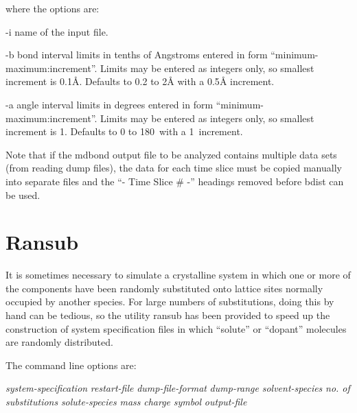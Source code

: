 \documentclass[a4paper,twoside]{report}
\begin{document}
where the options are:
\begin{Argdescription}
\item[-i] name of the input file.
\item[-b] bond interval limits in tenths of Angstroms entered in form
  ``minimum-maximum:increment''. Limits may be entered as integers
  only, so smallest increment is 0.1{\AA}. Defaults to 0.2 to 2{\AA} with
  a 0.5{\AA} increment.
\item[-a] angle interval limits in degrees entered in form
  ``minimum-maximum:increment''. Limits may be entered as integers only,
  so smallest increment is 1{\textdegree}. Defaults to 0 to
  180{\textdegree}\ with a 1{\textdegree}\ increment.
\end{Argdescription}

Note that if the mdbond output file to be analyzed contains
multiple data sets (from reading dump files), the data for each time slice
must be copied manually into separate files and the ``- Time Slice \# -''
headings removed before bdist can be used.


\section{Ransub}%
It is sometimes necessary to simulate a crystalline system in which one or
more of the components have been randomly substituted onto lattice sites
normally occupied by another species. For large numbers of substitutions,
doing this by hand can be tedious, so the utility ransub has been provided
to speed up the construction of system specification files in which
``solute'' or ``dopant'' molecules are randomly distributed.
        
The command line options are:
\begin{center}
\Lit{[-s} \textit{system-specification}\Lit{]}
\Lit{[-r} \textit{restart-file}\Lit{]}
\Lit{[-d} \textit{dump-file-format}\Lit{]}
\Lit{[-t} \textit{dump-range}\Lit{]} 
\Lit{[-m} \textit{solvent-species}\Lit{]} 
\Lit{[-n} \textit{no. of substitutions}\Lit{]} 
\Lit{[-u} \textit{solute-species}\Lit{]} 
\Lit{[-w} \textit{mass}\Lit{]} 
\Lit{[-q} \textit{charge}\Lit{]} 
\Lit{[-z} \textit{symbol}\Lit{]} 
\Lit{[-c]}
\Lit{[-o} \textit{output-file}\Lit{]}
\end{center}
\end{document}
